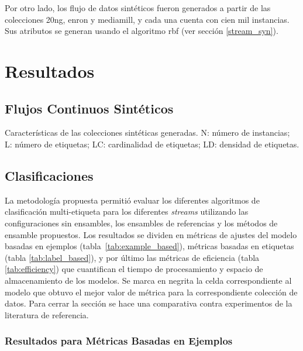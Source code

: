 Por otro lado, los flujo de datos sintéticos fueron generados a partir de las
colecciones 20ng, enron y mediamill, y cada una cuenta con cien mil instancias.
Sus atributos se generan usando el algoritmo \acrfull{rbf} (ver sección
\ref{stream_syn}).

\section{Resultados}

\subsection{Flujos Continuos Sintéticos}

\begin{table}[htbp]
	\centering
	
	\caption{Características de las colecciones sintéticas generadas.
		N: número de instancias; L: número de etiquetas; LC: cardinalidad de
		etiquetas; LD: densidad de etiquetas.}
	\label{tab:syn_datasets}
\end{table}

\subsection{Clasificaciones}

La metodología propuesta permitió evaluar los diferentes algoritmos de
clasificación multi-etiqueta para los diferentes \textit{streams} utilizando las
configuraciones sin ensambles, los ensambles de referencias y los métodos de
ensamble propuestos. Los resultados se dividen en métricas de ajustes del modelo
basadas en ejemplos (tabla~\ref{tab:example_based}), métricas basadas en
etiquetas (tabla \ref{tab:label_based}), y por último las métricas de eficiencia
(tabla \ref{tab:efficiency}) que cuantifican el tiempo de procesamiento y
espacio de almacenamiento de los modelos. Se marca en negrita la celda
correspondiente al modelo que obtuvo el mejor valor de métrica para la
correspondiente colección de datos. Para cerrar la sección se hace una
comparativa contra experimentos de la literatura de referencia.

\subsubsection{Resultados para Métricas Basadas en Ejemplos}

